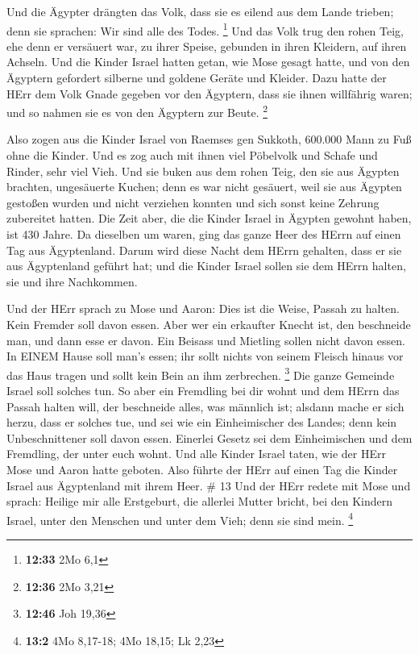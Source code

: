  Und die Ägypter drängten das Volk, dass sie es eilend aus
dem Lande trieben; denn sie sprachen: Wir sind alle des Todes.
\footnote{\textbf{12:33} 2Mo 6,1}  Und das Volk trug den
rohen Teig, ehe denn er versäuert war, zu ihrer Speise, gebunden in
ihren Kleidern, auf ihren Achseln.  Und die Kinder Israel
hatten getan, wie Mose gesagt hatte, und von den Ägyptern gefordert
silberne und goldene Geräte und Kleider.  Dazu hatte der
HErr dem Volk Gnade gegeben vor den Ägyptern, dass sie ihnen willfährig
waren; und so nahmen sie es von den Ägyptern zur Beute. \footnote{\textbf{12:36}
  2Mo 3,21}

 Also zogen aus die Kinder Israel von Raemses gen Sukkoth,
600.000 Mann zu Fuß ohne die Kinder.  Und es zog auch mit
ihnen viel Pöbelvolk und Schafe und Rinder, sehr viel Vieh.
 Und sie buken aus dem rohen Teig, den sie aus Ägypten
brachten, ungesäuerte Kuchen; denn es war nicht gesäuert, weil sie aus
Ägypten gestoßen wurden und nicht verziehen konnten und sich sonst keine
Zehrung zubereitet hatten.  Die Zeit aber, die die Kinder
Israel in Ägypten gewohnt haben, ist 430 Jahre.  Da
dieselben um waren, ging das ganze Heer des HErrn auf einen Tag aus
Ägyptenland.  Darum wird diese Nacht dem HErrn gehalten,
dass er sie aus Ägyptenland geführt hat; und die Kinder Israel sollen
sie dem HErrn halten, sie und ihre Nachkommen.

 Und der HErr sprach zu Mose und Aaron: Dies ist die Weise,
Passah zu halten. Kein Fremder soll davon essen.  Aber wer
ein erkaufter Knecht ist, den beschneide man, und dann esse er davon.
 Ein Beisass und Mietling sollen nicht davon essen.
 In EINEM Hause soll man's essen; ihr sollt nichts von
seinem Fleisch hinaus vor das Haus tragen und sollt kein Bein an ihm
zerbrechen. \footnote{\textbf{12:46} Joh 19,36}  Die ganze
Gemeinde Israel soll solches tun.  So aber ein Fremdling
bei dir wohnt und dem HErrn das Passah halten will, der beschneide
alles, was männlich ist; alsdann mache er sich herzu, dass er solches
tue, und sei wie ein Einheimischer des Landes; denn kein Unbeschnittener
soll davon essen.  Einerlei Gesetz sei dem Einheimischen
und dem Fremdling, der unter euch wohnt.  Und alle Kinder
Israel taten, wie der HErr Mose und Aaron hatte geboten. 
Also führte der HErr auf einen Tag die Kinder Israel aus Ägyptenland mit
ihrem Heer. \# 13  Und der HErr redete mit Mose und sprach:
 Heilige mir alle Erstgeburt, die allerlei Mutter bricht,
bei den Kindern Israel, unter den Menschen und unter dem Vieh; denn sie
sind mein. \footnote{\textbf{13:2} 4Mo 8,17-18; 4Mo 18,15; Lk 2,23}

